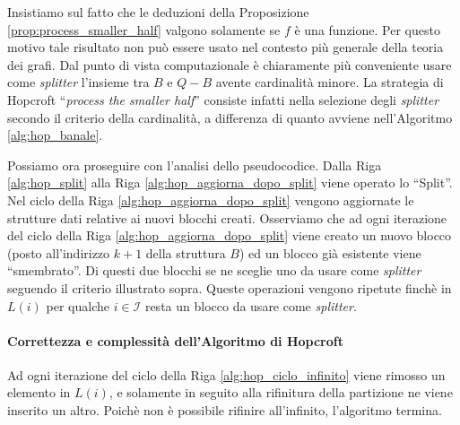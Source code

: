 Insistiamo sul fatto che le deduzioni della Proposizione \ref{prop:process_smaller_half} valgono solamente se $f$ è una funzione. Per questo motivo tale risultato non può essere usato nel contesto più generale della teoria dei grafi. Dal punto di vista computazionale è chiaramente più conveniente usare come \emph{splitter} l'insieme tra $B$ e $Q - B$ avente cardinalità minore. La strategia di Hopcroft ``\emph{process the smaller half}'' consiste infatti nella selezione degli \emph{splitter} secondo il criterio della cardinalità, a differenza di quanto avviene nell'Algoritmo \ref{alg:hop_banale}.

Possiamo ora proseguire con l'analisi dello pseudocodice. Dalla Riga \ref{alg:hop_split} alla Riga \ref{alg:hop_aggiorna_dopo_split} viene operato lo ``Split''. Nel ciclo della Riga \ref{alg:hop_aggiorna_dopo_split} vengono aggiornate le strutture dati relative ai nuovi blocchi creati. Osserviamo che ad ogni iterazione del ciclo della Riga \ref{alg:hop_aggiorna_dopo_split} viene creato un nuovo blocco (posto all'indirizzo $k+1$ della struttura $B$) ed un blocco già esistente viene ``smembrato''. Di questi due blocchi se ne sceglie uno da usare come \emph{splitter} seguendo il criterio illustrato sopra. Queste operazioni vengono ripetute finchè in $L(i)$ per qualche $i \in \mathcal{I}$ resta un blocco da usare come \emph{splitter}.

\paragraph{Correttezza e complessità dell'Algoritmo di Hopcroft} Ad ogni iterazione del ciclo della Riga \ref{alg:hop_ciclo_infinito} viene rimosso un elemento in $L(i)$, e solamente in seguito alla rifinitura della partizione ne viene inserito un altro. Poichè non è possibile rifinire all'infinito, l'algoritmo termina.

